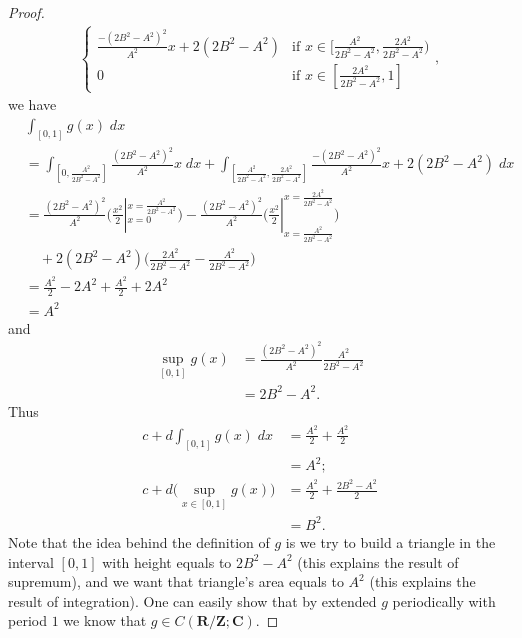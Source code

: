 \begin{proof}
\begin{align*}
\begin{cases}
            \frac{-(2 B^2 - A^2)^2}{A^2} x + 2 (2 B^2 - A^2) & \text{if } x \in [\frac{A^2}{2 B^2 - A^2}, \frac{2 A^2}{2 B^2 - A^2}) \\
            0                                                & \text{if } x \in [\frac{2 A^2}{2 B^2 - A^2}, 1]
        \end{cases},
    \end{align*}
    we have
    \begin{align*}
         & \int_{[0, 1]} g(x) \; dx                                                                                                                                                                                              \\
         & = \int_{[0, \frac{A^2}{2 B^2 - A^2}]} \frac{(2 B^2 - A^2)^2}{A^2} x \; dx + \int_{[\frac{A^2}{2 B^2 - A^2}, \frac{2 A^2}{2 B^2 - A^2}]} \frac{-(2 B^2 - A^2)^2}{A^2} x + 2 (2 B^2 - A^2) \; dx                        \\
         & = \frac{(2 B^2 - A^2)^2}{A^2} \bigg(\frac{x^2}{2}|_{x = 0}^{x = \frac{A^2}{2 B^2 - A^2}}\bigg) - \frac{(2 B^2 - A^2)^2}{A^2} \bigg(\frac{x^2}{2}|_{x = \frac{A^2}{2 B^2 - A^2}}^{x = \frac{2 A^2}{2 B^2 - A^2}}\bigg) \\
         & \quad + 2 (2 B^2 - A^2) \bigg(\frac{2 A^2}{2 B^2 - A^2} - \frac{A^2}{2 B^2 - A^2}\bigg)                                                                                                                               \\
         & = \frac{A^2}{2} - 2 A^2 + \frac{A^2}{2} + 2 A^2                                                                                                                                                                       \\
         & = A^2
    \end{align*}
    and
    \begin{align*}
        \sup_{[0, 1]} g(x) & = \frac{(2 B^2 - A^2)^2}{A^2} \frac{A^2}{2 B^2 - A^2} \\
                           & = 2 B^2 - A^2.
    \end{align*}
    Thus
    \begin{align*}
        c + d \int_{[0, 1]} g(x) \; dx           & = \frac{A^2}{2} + \frac{A^2}{2}         \\
                                                 & = A^2;                                  \\
        c + d \big(\sup_{x \in [0, 1]} g(x)\big) & = \frac{A^2}{2} + \frac{2 B^2 - A^2}{2} \\
                                                 & = B^2.
    \end{align*}
    Note that the idea behind the definition of \(g\) is we try to build a triangle in the interval \([0, 1]\) with height equals to \(2 B^2 - A^2\) (this explains the result of supremum), and we want that triangle's area equals to \(A^2\) (this explains the result of integration).
    One can easily show that by extended \(g\) periodically with period \(1\) we know that \(g \in C(\mathbf{R} / \mathbf{Z} ; \mathbf{C})\).
\end{proof}

